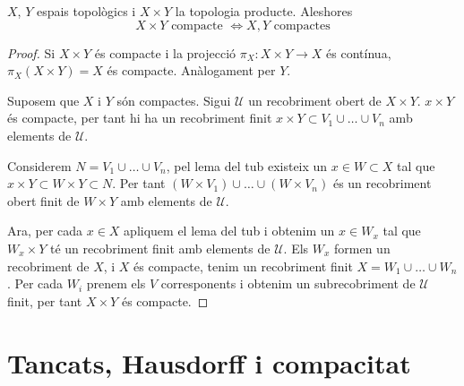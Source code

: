 \begin{prop}
    $X$, $Y$ espais topològics i $X \times Y$ la topologia producte. Aleshores
    \[X \times Y \text{ compacte } \Longleftrightarrow X,Y \text{ compactes}\]
\end{prop}
\begin{proof}
    Si $X \times Y$ és compacte i la projecció $\pi_X\!: X \times Y \rightarrow X$ és contínua, $\pi_X(X\times Y)=X$ és compacte. Anàlogament per $Y$.
    
    \quad
    
    Suposem que $X$ i $Y$ són compactes. Sigui $\mathscr{U}$ un recobriment obert de $X \times Y$. $x \times Y$ és compacte, per tant hi ha un recobriment finit $x \times Y \subset V_1 \cup\dots\cup V_n$ amb elements de $\mathscr{U}$.
    
    Considerem $N = V_1 \cup\dots\cup V_n$, pel lema del tub existeix un $x \in W \subset X$ tal que $x\times Y \subset W \times Y \subset N$. Per tant $(W \times V_1) \cup\dots\cup (W \times V_n)$ és un recobriment obert finit de $W \times Y$ amb elements de $\mathscr{U}$.
    
    Ara, per cada $x\in X$ apliquem el lema del tub i obtenim un $x \in W_x$ tal que $W_x \times Y$ té un recobriment finit amb elements de $\mathscr{U}$. Els $W_x$ formen un recobriment de $X$, i $X$ és compacte, tenim un recobriment finit $X = W_1 \cup\dots\cup W_n$. Per cada $W_i$ prenem els $V$ corresponents i obtenim un subrecobriment de $\mathscr{U}$ finit, per tant $X\times Y$ és compacte.
    
\end{proof}


\section{Tancats, Hausdorff i compacitat}

